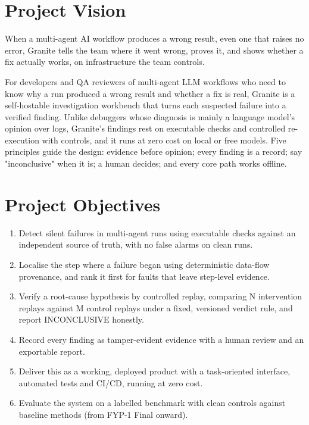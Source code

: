 \documentclass{fast-nuces-bs}
\begin{document}
\section{Project Vision}

When a multi-agent AI workflow produces a wrong result, even one that raises no error, Granite tells the team where it went wrong, proves it, and shows whether a fix actually works, on infrastructure the team controls.

For developers and QA reviewers of multi-agent LLM workflows who need to know why a run produced a wrong result and whether a fix is real, Granite is a self-hostable investigation workbench that turns each suspected failure into a verified finding. Unlike debuggers whose diagnosis is mainly a language model's opinion over logs, Granite's findings rest on executable checks and controlled re-execution with controls, and it runs at zero cost on local or free models. Five principles guide the design: evidence before opinion; every finding is a record; say "inconclusive" when it is; a human decides; and every core path works offline.

\section{Project Objectives}

\begin{enumerate}
\item Detect silent failures in multi-agent runs using executable checks against an independent source of truth, with no false alarms on clean runs.
\item Localise the step where a failure began using deterministic data-flow provenance, and rank it first for faults that leave step-level evidence.
\item Verify a root-cause hypothesis by controlled replay, comparing N intervention replays against M control replays under a fixed, versioned verdict rule, and report INCONCLUSIVE honestly.
\item Record every finding as tamper-evident evidence with a human review and an exportable report.
\item Deliver this as a working, deployed product with a task-oriented interface, automated tests and CI/CD, running at zero cost.
\item Evaluate the system on a labelled benchmark with clean controls against baseline methods (from FYP-1 Final onward).
\end{enumerate}
\end{document}
